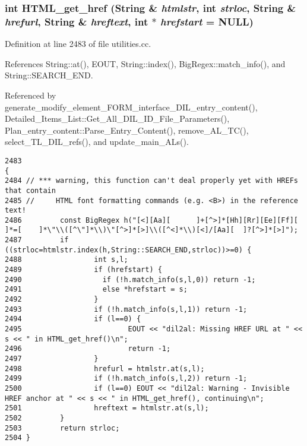 \subsubsection{\setlength{\rightskip}{0pt plus 5cm}int HTML\_\-get\_\-href ({\bf String} \& {\em htmlstr}, int {\em strloc}, {\bf String} \& {\em hrefurl}, {\bf String} \& {\em hreftext}, int $\ast$ {\em hrefstart} = NULL)}\label{utilities_8cc_a58}




Definition at line 2483 of file utilities.cc.

References String::at(), EOUT, String::index(), Big\-Regex::match\_\-info(), and String::SEARCH\_\-END.

Referenced by generate\_\-modify\_\-element\_\-FORM\_\-interface\_\-DIL\_\-entry\_\-content(), Detailed\_\-Items\_\-List::Get\_\-All\_\-DIL\_\-ID\_\-File\_\-Parameters(), Plan\_\-entry\_\-content::Parse\_\-Entry\_\-Content(), remove\_\-AL\_\-TC(), select\_\-TL\_\-DIL\_\-refs(), and update\_\-main\_\-ALs().



\footnotesize\begin{verbatim}2483                                                                                                              {
2484 // *** warning, this function can't deal properly yet with HREFs that contain
2485 //     HTML font formatting commands (e.g. <B>) in the reference text!
2486         const BigRegex h("[<][Aa][      ]+[^>]*[Hh][Rr][Ee][Ff][        ]*=[    ]*\"\\([^\"]*\\)\"[^>]*[>]\\([^<]*\\)[<]/[Aa][  ]?[^>]*[>]");
2487         if ((strloc=htmlstr.index(h,String::SEARCH_END,strloc))>=0) {
2488                 int s,l;
2489                 if (hrefstart) {
2490                   if (!h.match_info(s,l,0)) return -1;
2491                   else *hrefstart = s;
2492                 }
2493                 if (!h.match_info(s,l,1)) return -1;
2494                 if (l==0) {
2495                         EOUT << "dil2al: Missing HREF URL at " << s << " in HTML_get_href()\n";
2496                         return -1;
2497                 }
2498                 hrefurl = htmlstr.at(s,l);
2499                 if (!h.match_info(s,l,2)) return -1;
2500                 if (l==0) EOUT << "dil2al: Warning - Invisible HREF anchor at " << s << " in HTML_get_href(), continuing\n";
2501                 hreftext = htmlstr.at(s,l);
2502         }
2503         return strloc;
2504 }
\end{verbatim}\normalsize 
{}
